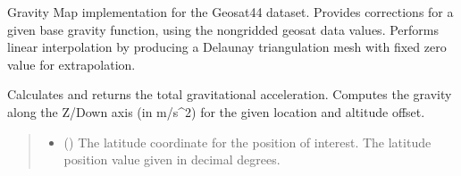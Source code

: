 \documentclass[letterpaper,10pt,english]{sphinxmanual}
\begin{document}
\begin{fulllineitems}
\label{\detokenize{modules/gravity/geosat:qnav.gravity.geosat.Geosat44}}
\pysigstartsignatures
{}
\pysigstopsignatures
\sphinxAtStartPar
Gravity Map implementation for the Geosat\sphinxhyphen{}44 dataset.
Provides corrections for a given base gravity function, using the
non\sphinxhyphen{}gridded geosat data values. Performs linear interpolation by
producing a Delaunay triangulation mesh with fixed zero value for
extrapolation.

\begin{fulllineitems}
\label{\detokenize{modules/gravity/geosat:qnav.gravity.geosat.Geosat44.calc_gravity_z}}
\pysigstartsignatures
{}
\pysigstopsignatures
\sphinxAtStartPar
Calculates and returns the total gravitational acceleration.
Computes the gravity along the Z/Down axis (in m/s\textasciicircum{}2) for
the given location and altitude offset.
\begin{quote}\begin{description}
\begin{itemize}
\item {} 
\sphinxAtStartPar
{} () \textendash{} The latitude coordinate for the position of interest.
The latitude position value given in decimal degrees.


\end{itemize}
\end{description}
\end{quote}
\end{fulllineitems}
\end{fulllineitems}
\end{document}
